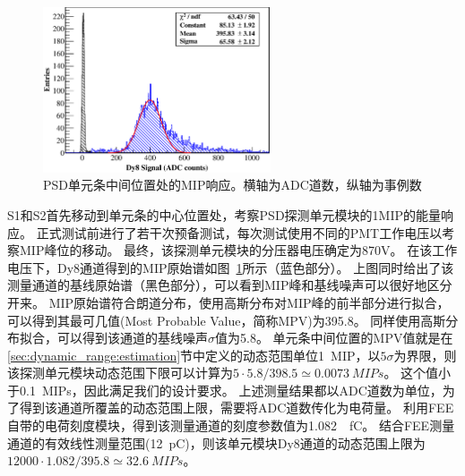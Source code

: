 \begin{figure}[htbp]
	\centering
	\includegraphics[width=0.6\textwidth]{chap/dynamic_range/fig/mip.eps}
	\caption{PSD单元条中间位置处的MIP响应。横轴为ADC道数，纵轴为事例数}
	\label{fig:dynamic_range:mip}
\end{figure}
S1和S2首先移动到单元条的中心位置处，考察PSD探测单元模块的1MIP的能量响应。
正式测试前进行了若干次预备测试，每次测试使用不同的PMT工作电压以考察MIP峰位的移动。
最终，该探测单元模块的分压器电压确定为870V。
在该工作电压下，Dy8通道得到的MIP原始谱如图~\ref{fig:dynamic_range:mip}所示（蓝色部分）。
上图同时给出了该测量通道的基线原始谱（黑色部分），可以看到MIP峰和基线噪声可以很好地区分开来。
MIP原始谱符合朗道分布，使用高斯分布对MIP峰的前半部分进行拟合，可以得到其最可几值(Most Probable Value，简称MPV)为395.8。
同样使用高斯分布拟合，可以得到该通道的基线噪声$\sigma$值为5.8。
单元条中间位置的MPV值就是在\ref{sec:dynamic_range:estimation}节中定义的动态范围单位\SI{1}{MIP}，以$5\sigma$为界限，则该探测单元模块动态范围下限可以计算为$5\cdot5.8/398.5\simeq\SI{0.0073}{MIPs}$。
这个值小于\SI{0.1}{MIPs}，因此满足我们的设计要求。
上述测量结果都以ADC道数为单位，为了得到该通道所覆盖的动态范围上限，需要将ADC道数传化为电荷量。
利用FEE自带的电荷刻度模块，得到该测量通道的刻度参数值为\SI{1.082}{\per\femto\coulomb}。
结合FEE测量通道的有效线性测量范围(\SI{12}{\pico\coulomb})，则该单元模块Dy8通道的动态范围上限为$12000\cdot 1.082/395.8 \simeq \SI{32.6}{MIPs}$。

